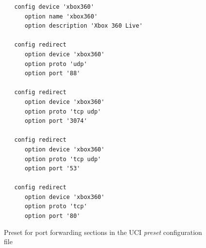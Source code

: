 \documentclass[a4paper,11pt]{kth-bcs}
\begin{document}
   \begin{figure}[ht]
      \centering
      \begin{verbatim}
   config device 'xbox360'
      option name 'xbox360'
      option description 'Xbox 360 Live'

   config redirect
      option device 'xbox360'
      option proto 'udp'
      option port '88'

   config redirect
      option device 'xbox360'
      option proto 'tcp udp'
      option port '3074'

   config redirect
      option device 'xbox360'
      option proto 'tcp udp'
      option port '53'

   config redirect
      option device 'xbox360'
      option proto 'tcp'
      option port '80'
      \end{verbatim}
      \caption{
         \small{
Preset for port forwarding sections in the UCI \emph{preset} configuration file
         }
      }
      \label{fig:preset_conf}
   \end{figure}



\end{document}
